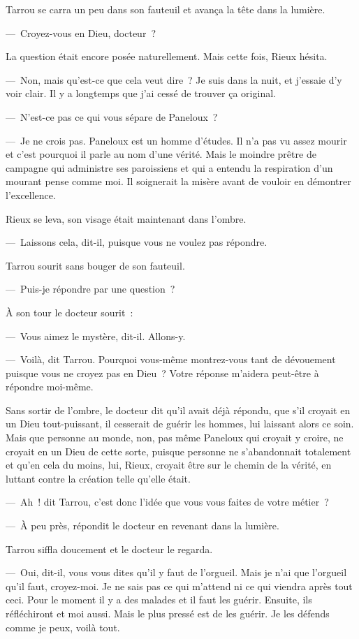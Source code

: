 \documentclass[french,twoside]{book} %
\begin{document}
Tarrou se carra un peu dans son fauteuil et avança la tête dans la lumière.\par
— Croyez-vous en Dieu, docteur ?\par
La question était encore posée naturellement. Mais cette fois, Rieux hésita.\par
— Non, mais qu’est-ce que cela veut dire ? Je suis dans la nuit, et j’essaie d’y voir clair. Il y a longtemps que j’ai cessé de trouver ça original.\par
— N’est-ce pas ce qui vous sépare de Paneloux ?\par
— Je ne crois pas. Paneloux est un homme d’études. Il n’a pas vu assez mourir et c’est pourquoi il parle au nom d’une vérité. Mais le moindre prêtre de campagne qui administre ses paroissiens et qui a entendu la respiration d’un mourant pense comme moi. Il soignerait la misère avant de vouloir en démontrer l’excellence.\par
Rieux se leva, son visage était maintenant dans l’ombre.\par
— Laissons cela, dit-il, puisque vous ne voulez pas répondre.\par
Tarrou sourit sans bouger de son fauteuil.\par
— Puis-je répondre par une question ?\par
À son tour le docteur sourit :\par
— Vous aimez le mystère, dit-il. Allons-y.\par
— Voilà, dit Tarrou. Pourquoi vous-même montrez-vous tant de dévouement puisque vous ne croyez pas en Dieu ? Votre réponse m’aidera peut-être à répondre moi-même.\par
Sans sortir de l’ombre, le docteur dit qu’il avait déjà répondu, que s’il croyait en un Dieu tout-puissant, il cesserait de guérir les hommes, lui laissant alors ce soin. Mais que personne au monde, non, pas même Paneloux qui croyait y croire, ne croyait en un Dieu de cette sorte, puisque personne ne s’abandonnait totalement et qu’en cela du moins, lui, Rieux, croyait être sur le chemin de la vérité, en luttant contre la création telle qu’elle était.\par
— Ah ! dit Tarrou, c’est donc l’idée que vous vous faites de votre métier ?\par
— À peu près, répondit le docteur en revenant dans la lumière.\par
Tarrou siffla doucement et le docteur le regarda.\par
— Oui, dit-il, vous vous dites qu’il y faut de l’orgueil. Mais je n’ai que l’orgueil qu’il faut, croyez-moi. Je ne sais pas ce qui m’attend ni ce qui viendra après tout ceci. Pour le moment il y a des malades et il faut les guérir. Ensuite, ils réfléchiront et moi aussi. Mais le plus pressé est de les guérir. Je les défends comme je peux, voilà tout.\par
\end{document}
